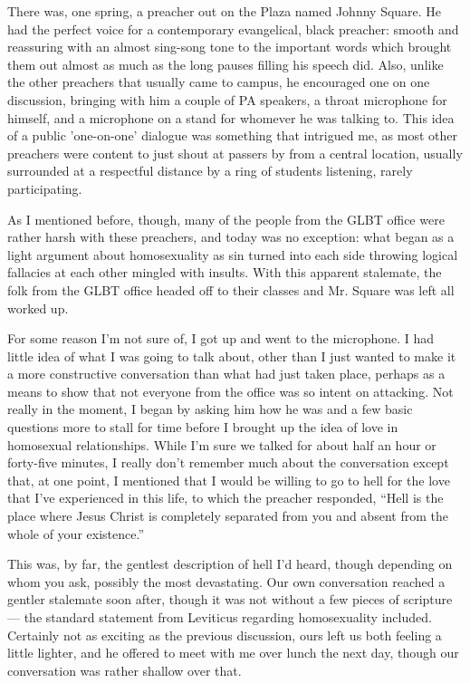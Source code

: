 \documentclass{book}
\begin{document}
There was, one spring, a preacher out on the Plaza named Johnny Square.  He had the perfect voice for a contemporary evangelical, black preacher: smooth and reassuring with an almost sing-song tone to the important words which brought them out almost as much as the long pauses filling his speech did.  Also, unlike the other preachers that usually came to campus, he encouraged one on one discussion, bringing with him a couple of PA speakers, a throat microphone for himself, and a microphone on a stand for whomever he was talking to.  This idea of a public 'one-on-one' dialogue was something that intrigued me, as most other preachers were content to just shout at passers by from a central location, usually surrounded at a respectful distance by a ring of students listening, rarely participating.

As I mentioned before, though, many of the people from the GLBT office were rather harsh with these preachers, and today was no exception: what began as a light argument about homosexuality as sin turned into each side throwing logical fallacies at each other mingled with insults.  With this apparent stalemate, the folk from the GLBT office headed off to their classes and Mr.  Square was left all worked up.

For some reason I'm not sure of, I got up and went to the microphone.  I had little idea of what I was going to talk about, other than I just wanted to make it a more constructive conversation than what had just taken place, perhaps as a means to show that not everyone from the office was so intent on attacking.  Not really in the moment, I began by asking him how he was and a few basic questions more to stall for time before I brought up the idea of love in homosexual relationships.  While I'm sure we talked for about half an hour or forty-five minutes, I really don't remember much about the conversation except that, at one point, I mentioned that I would be willing to go to hell for the love that I've experienced in this life, to which the preacher responded, ``Hell is the place where Jesus Christ is completely separated from you and absent from the whole of your existence.''

This was, by far, the gentlest description of hell I'd heard, though depending on whom you ask, possibly the most devastating.  Our own conversation reached a gentler stalemate soon after, though it was not without a few pieces of scripture --- the standard statement from Leviticus regarding homosexuality included.  Certainly not as exciting as the previous discussion, ours left us both feeling a little lighter, and he offered to meet with me over lunch the next day, though our conversation was rather shallow over that.
\end{document}
